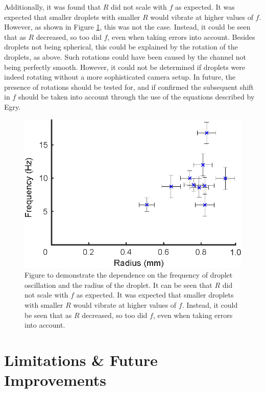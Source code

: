 \documentclass{physics_article_B}
\begin{document}
        Additionally, it was found that $R$ did not scale with $f$ as expected. It was expected that smaller droplets with smaller $R$ would vibrate at higher values of $f$. However, as shown in Figure \ref{fig:rvsf}, this was not the case. Instead, it could be seen that as $R$ decreased, so too did $f$, even when taking errors into account. Besides droplets not being spherical, this could be explained by the rotation of the droplets, as above. Such rotations could have been caused by the channel not being perfectly smooth. However, it could not be determined if droplets were indeed rotating without a more sophisticated camera setup. In future, the presence of rotations should be tested for, and if confirmed the subsequent shift in $f$ should be taken into account through the use of the equations described by Egry\cite{egry}. 
        
        \vspace{0.5cm}\begin{figure}[H]
            \centering
            \hspace*{-0.7cm}\includegraphics{Figures/r_vs_f.eps}
            \caption{Figure to demonstrate the dependence on the frequency of droplet oscillation and the radius of the droplet. It can be seen that $R$ did not scale with $f$ as expected. It was expected that smaller droplets with smaller $R$ would vibrate at higher values of $f$. Instead, it could be seen that as $R$ decreased, so too did $f$, even when taking errors into account.}     
            \label{fig:rvsf}
        \end{figure} 
        
        
\newpage \section{Limitations \& Future Improvements\label{sect:limitations}}
    
\end{document}
